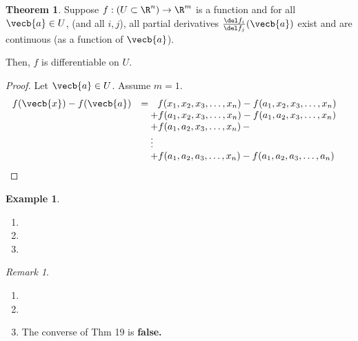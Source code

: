 \documentclass[a5paper]{article}
\theoremstyle{definition}%
\newtheorem{theorem}{Theorem}
\newtheorem*{example*}{Example}
\numberwithin{exercise}{section}
\theoremstyle{remark}%
\newtheorem*{remark*}{Remark}
\begin{document}
\begin{highlight}
\begin{theorem}
Suppose  $f:(U\subset\R^n)\to\R^m$ is a function and for all $\vecb{a}\in U$, (and all $i,j$), all partial derivatives $\frac{\del f_i}{\del f_j}(\vecb{a})$ exist and are continuous (as a function of $\vecb{a}$). 

\mbox{}

\noindent Then, $f$ is differentiable on $U$. 
\end{theorem}
\end{highlight}
\begin{proof}
Let $\vecb{a}\in U$. Assume $m=1$. 
\[\begin{array}{rll}
f(\vecb{x})-f(\vecb{a})&= \, \, \, \, f(x_1, x_2, x_3, \ldots, x_n)-f(a_1, x_2, x_3, \ldots, x_n)& \\
&\quad +f(a_1, x_2, x_3, \ldots, x_n)-f(a_1, a_2, x_3, \ldots, x_n)& \\
&\quad +f(a_1, a_2, x_3, \ldots, x_n)\,-& \\
&\quad \vdots&\\
&\quad +f(a_1, a_2, a_3, \ldots, x_n)-f(a_1, a_2, a_3, \ldots, a_n)& \\
\end{array}\]
\end{proof}

\begin{example*}\mbox{}
	\begin{enumerate}
	\item \mbox{}
	\item \mbox{}
	\item \mbox{}
	\end{enumerate}
\end{example*}

\pagebreak
\begin{remark*}\mbox{}
	\begin{enumerate}
	\item \mbox{}
	\item \mbox{}
	\item \mbox{}
	The converse of Thm 19 is \textbf{false.}
	\end{enumerate}
\end{remark*}
\end{document}
